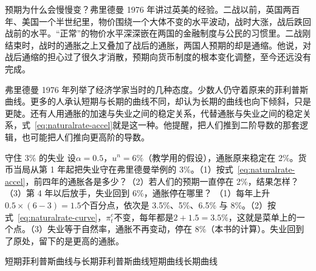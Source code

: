 预期为什么会慢慢变？弗里德曼 1976 年讲过英美的经验\cite{friedman1976}。二战以前，英国两百年、美国一个半世纪里，物价围绕一个大体不变的水平波动，战时大涨，战后跌回战前的水平\cite{friedman1976}。“正常”的物价水平深深嵌在两国的金融制度与公民的习惯里\cite{friedman1976}。二战刚结束时，战时的通胀之上又叠加了战后的通胀，两国人预期的却是通缩\cite{friedman1976}。他说，对战后通缩的担心过了很久才消散，预期向货币制度的根本变化调整，至今还远没有完成\cite{friedman1976}。

弗里德曼 1976 年列举了经济学家当时的几种态度\cite{friedman1976}。少数人仍守着原来的菲利普斯曲线\cite{friedman1976}。更多的人承认短期与长期的曲线不同，却认为长期的曲线也向下倾斜，只是更陡\cite{friedman1976}。还有人用通胀的加速与失业之间的稳定关系，代替通胀与失业之间的稳定关系，式~\eqref{eq:naturalrate-accel}就是这一种\cite{friedman1976}。他提醒，把人们推到二阶导数的那套逻辑，也可能把人们推向更高阶的导数\cite{friedman1976}。

\begin{example}{守住 3\% 的失业}\label{ex:naturalrate-accel}
设$\alpha=0.5$，$u^{n}=6\%$（教学用的假设），通胀原来稳定在 2\%。货币当局从第 1 年起把失业守在弗里德曼举例的 3\%。（1）按式~\eqref{eq:naturalrate-accel}，前四年的通胀各是多少？（2）若人们的预期一直停在 2\%，结果怎样？（3）第 4 年以后放手，失业回到 6\%，通胀停在哪里？
\solution
（1）每年上升$0.5\times(6-3)=1.5$个百分点，依次是 3.5\%、5\%、6.5\% 与 8\%。（2）按式~\eqref{eq:naturalrate-curve}，$\pi^{e}_t$不变，每年都是$2+1.5=3.5\%$，这就是菜单上的一个点。（3）失业等于自然率，通胀不再变动，停在 8\%（本书的计算）。失业回到了原处，留下的是更高的通胀。
\end{example}

\begin{compare}{短期菲利普斯曲线与长期菲利普斯曲线}{短期曲线}{长期曲线}
\end{compare}

